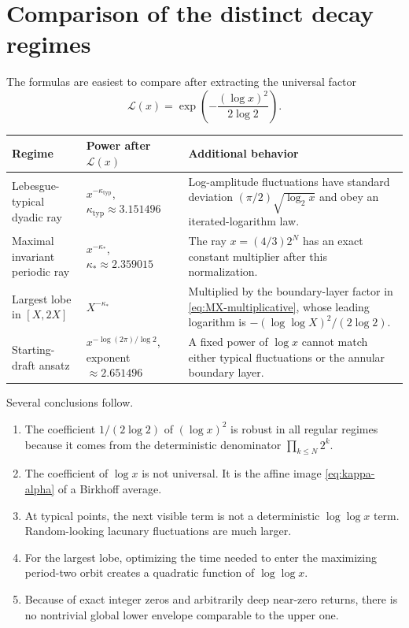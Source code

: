\documentclass[11pt,oneside]{article}
\theoremstyle{definition}
\theoremstyle{remark}
\begin{document}
\section{Comparison of the distinct decay regimes}

The formulas are easiest to compare after extracting the universal factor
\begin{equation}
 \mathcal L(x)=\exp\!\left(-\frac{(\log x)^2}{2\log2}\right).
\end{equation}

\begin{center}
\begin{tabularx}{0.98\textwidth}{@{}>{\raggedright\arraybackslash}p{}
 >{\raggedright\arraybackslash}p{}X@{}}
\toprule
Regime & Power after $\mathcal L(x)$ & Additional behavior\\
\midrule
Lebesgue-typical dyadic ray
& $x^{-\kappa_{\mathrm{typ}}}$, $\kappa_{\mathrm{typ}}\approx3.151496$
& Log-amplitude fluctuations have standard deviation
  $(\pi/2)\sqrt{\log_2x}$ and obey an iterated-logarithm law.\\[0.5em]
Maximal invariant periodic ray
& $x^{-\kappa_*}$, $\kappa_*\approx2.359015$
& The ray $x=(4/3)2^N$ has an exact constant multiplier after this normalization.\\[0.5em]
Largest lobe in $[X,2X]$
& $X^{-\kappa_*}$
& Multiplied by the boundary-layer factor in \eqref{eq:MX-multiplicative}, whose leading logarithm is
  $-(\log\log X)^2/(2\log2)$.\\[0.5em]
Starting-draft ansatz
& $x^{-\log(2\pi)/\log2}$, exponent $\approx2.651496$
& A fixed power of $\log x$ cannot match either typical fluctuations or the annular boundary layer.\\
\bottomrule
\end{tabularx}
\end{center}

Several conclusions follow.

\begin{enumerate}
\item The coefficient $1/(2\log2)$ of $(\log x)^2$ is robust in all regular
      regimes because it comes from the deterministic denominator
      $\prod_{k\le N}2^k$.
\item The coefficient of $\log x$ is not universal.  It is the affine image
      \eqref{eq:kappa-alpha} of a Birkhoff average.
\item At typical points, the next visible term is not a deterministic
      $\log\log x$ term.  Random-looking lacunary fluctuations are much larger.
\item For the largest lobe, optimizing the time needed to enter the maximizing
      period-two orbit creates a quadratic function of $\log\log x$.
\item Because of exact integer zeros and arbitrarily deep near-zero returns,
      there is no nontrivial global lower envelope comparable to the upper one.
\end{enumerate}
\end{document}
